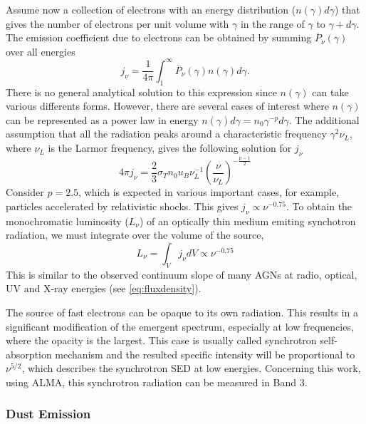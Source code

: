Assume now a collection of electrons with an energy distribution ($n(\gamma)d\gamma$) that gives the number of electrons per unit volume with $\gamma$ in the range of $\gamma$ to $\gamma + d\gamma$. The emission coefficient due to electrons can be obtained by summing $\overline{P}_{\nu}(\gamma)$ over all energies
\begin{equation}
j_{\nu} = \frac{1}{4\pi}\int_{1}^{\infty} \overline{P}_{\nu}(\gamma) n(\gamma) d\gamma.
\end{equation}
There is no general analytical solution to this expression since $n(\gamma)$ can take various differents forms. However, there are several cases of interest where $n(\gamma)$ can be represented as a power law in energy $n(\gamma)d\gamma = n_0 \gamma^{-p} d\gamma$. The additional assumption that all the radiation peaks around a characteristic frequency $\gamma^2 \nu_L$, where $\nu_L$ is the Larmor frequency, gives the following solution for $j_\nu$
\begin{equation}
4 \pi j_\nu = \frac{2}{3} \sigma_{T} n_0 u_B \nu_{L}^{-1} \left( \frac{\nu}{\nu_L} \right)^{-\frac{p-1}{2}}
\end{equation}
Consider $p = 2.5$, which is expected in various important cases, for example, particles accelerated by relativistic shocks. This  gives $j_\nu \varpropto \nu^{-0.75}$. To obtain the monochromatic luminosity ($L_\nu$) of an optically thin medium emiting synchotron radiation, we must integrate over the volume of the source,
\begin{equation}
L_\nu = \int_{V} j_\nu dV \varpropto \nu^{-0.75}
\end{equation}
This is similar to the observed continuum slope of many AGNs at radio, optical, UV and X-ray energies (see \autoref{eq:fluxdensity}).

The source of fast electrons can be opaque to its own radiation. This results in a significant modification of the emergent spectrum, especially at low frequencies, where the opacity is the largest. This case is usually called synchrotron self-absorption mechanism and the resulted specific intensity will be proportional to $\nu^{5/2}$, which describes the synchrotron SED at low energies. Concerning this work, using ALMA, this synchrotron radiation can 
be measured in Band 3.

\subsubsection{Dust Emission}

